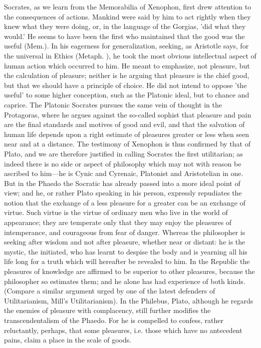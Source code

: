 \documentclass[11pt,letter]{article}
\begin{document}
\par  Socrates, as we learn from the Memorabilia of Xenophon, first drew attention to the consequences of actions. Mankind were said by him to act rightly when they knew what they were doing, or, in the language of the Gorgias, 'did what they would.' He seems to have been the first who maintained that the good was the useful (Mem.). In his eagerness for generalization, seeking, as Aristotle says, for the universal in Ethics (Metaph. ), he took the most obvious intellectual aspect of human action which occurred to him. He meant to emphasize, not pleasure, but the calculation of pleasure; neither is he arguing that pleasure is the chief good, but that we should have a principle of choice. He did not intend to oppose 'the useful' to some higher conception, such as the Platonic ideal, but to chance and caprice. The Platonic Socrates pursues the same vein of thought in the Protagoras, where he argues against the so-called sophist that pleasure and pain are the final standards and motives of good and evil, and that the salvation of human life depends upon a right estimate of pleasures greater or less when seen near and at a distance. The testimony of Xenophon is thus confirmed by that of Plato, and we are therefore justified in calling Socrates the first utilitarian; as indeed there is no side or aspect of philosophy which may not with reason be ascribed to him—he is Cynic and Cyrenaic, Platonist and Aristotelian in one. But in the Phaedo the Socratic has already passed into a more ideal point of view; and he, or rather Plato speaking in his person, expressly repudiates the notion that the exchange of a less pleasure for a greater can be an exchange of virtue. Such virtue is the virtue of ordinary men who live in the world of appearance; they are temperate only that they may enjoy the pleasures of intemperance, and courageous from fear of danger. Whereas the philosopher is seeking after wisdom and not after pleasure, whether near or distant: he is the mystic, the initiated, who has learnt to despise the body and is yearning all his life long for a truth which will hereafter be revealed to him. In the Republic the pleasures of knowledge are affirmed to be superior to other pleasures, because the philosopher so estimates them; and he alone has had experience of both kinds. (Compare a similar argument urged by one of the latest defenders of Utilitarianism, Mill's Utilitarianism). In the Philebus, Plato, although he regards the enemies of pleasure with complacency, still further modifies the transcendentalism of the Phaedo. For he is compelled to confess, rather reluctantly, perhaps, that some pleasures, i.e. those which have no antecedent pains, claim a place in the scale of goods.
\end{document}
